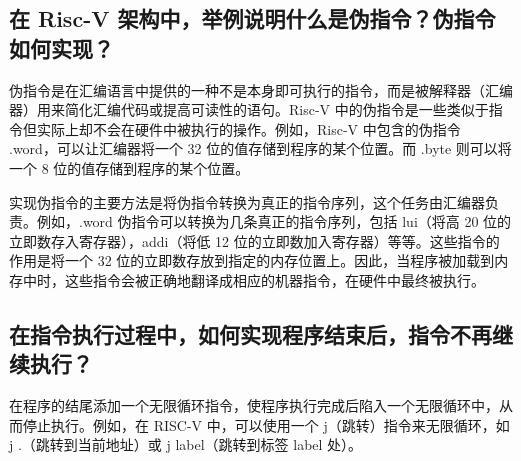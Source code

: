 \documentclass{article}
\begin{document}
    \subsection{在 Risc-V 架构中，举例说明什么是伪指令？伪指令如何实现？}
    伪指令是在汇编语言中提供的一种不是本身即可执行的指令，而是被解释器（汇编器）用来简化汇编代码或提高可读性的语句。Risc-V 中的伪指令是一些类似于指令但实际上却不会在硬件中被执行的操作。例如，Risc-V 中包含的伪指令 .word，可以让汇编器将一个 32 位的值存储到程序的某个位置。而 .byte 则可以将一个 8 位的值存储到程序的某个位置。\par
    实现伪指令的主要方法是将伪指令转换为真正的指令序列，这个任务由汇编器负责。例如，.word 伪指令可以转换为几条真正的指令序列，包括 lui（将高 20 位的立即数存入寄存器），addi（将低 12 位的立即数加入寄存器）等等。这些指令的作用是将一个 32 位的立即数存放到指定的内存位置上。因此，当程序被加载到内存中时，这些指令会被正确地翻译成相应的机器指令，在硬件中最终被执行。


    \subsection{在指令执行过程中，如何实现程序结束后，指令不再继续执行？}
    在程序的结尾添加一个无限循环指令，使程序执行完成后陷入一个无限循环中，从而停止执行。例如，在 RISC-V 中，可以使用一个 j（跳转）指令来无限循环，如 j .（跳转到当前地址）或 j label（跳转到标签 label 处）。
\end{document}
